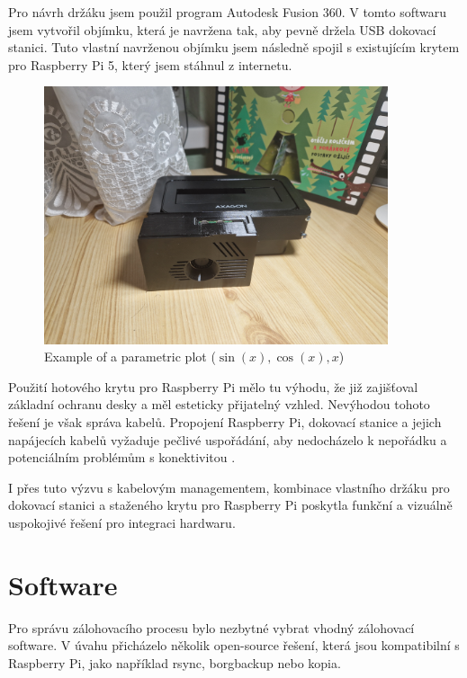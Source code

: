 \documentclass[a4paper,12pt, oneside]{book}
\begin{document}
Pro návrh držáku jsem použil program Autodesk Fusion 360. V tomto softwaru jsem
vytvořil objímku, která je navržena tak, aby pevně držela USB dokovací stanici.
Tuto vlastní navrženou objímku jsem následně spojil s existujícím krytem pro
Raspberry Pi 5, který jsem stáhnul z internetu. 

\begin{figure}[H]
\caption{Example of a parametric plot ($\sin (x), \cos(x), x$)}
\centering
\includegraphics[width=0.9\textwidth]{img/skladani4.jpg}
\end{figure}

Použití hotového krytu pro Raspberry Pi mělo tu výhodu, že již zajišťoval
základní ochranu desky a měl esteticky přijatelný vzhled. Nevýhodou tohoto
řešení je však správa kabelů. Propojení Raspberry Pi, dokovací stanice a jejich
napájecích kabelů vyžaduje pečlivé uspořádání, aby nedocházelo k nepořádku a
potenciálním problémům s konektivitou . 

I přes tuto výzvu s kabelovým managementem, kombinace vlastního
držáku pro dokovací stanici a staženého krytu pro Raspberry Pi poskytla funkční
a vizuálně uspokojivé řešení pro integraci hardwaru.


\chapter{Software}

Pro správu zálohovacího procesu bylo nezbytné vybrat vhodný zálohovací software.
V úvahu přicházelo několik open-source řešení, která jsou kompatibilní s
Raspberry Pi, jako například rsync, borgbackup nebo kopia.
\end{document}
